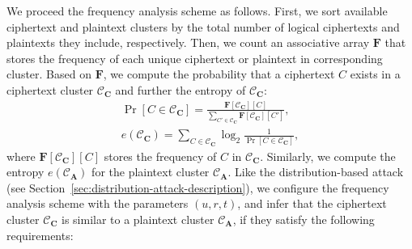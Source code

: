 We proceed the frequency analysis scheme as follows. First, we  sort available ciphertext and plaintext clusters by the total number of logical  ciphertexts and plaintexts they include, respectively. Then, we count an associative array $\mathbf{F}$ that stores the frequency of each unique ciphertext or plaintext in  corresponding cluster. Based on $\mathbf{F}$, we compute the probability that a  ciphertext $C$ exists in a ciphertext cluster $\mathcal{C}_\mathbf{C}$ and further the   
entropy of $\mathcal{C}_\mathbf{C}$:      
\begin{eqnarray*}
    \Pr[C \in \mathcal{C}_\mathbf{C}] = \frac{\mathbf{F}[\mathcal{C}_\mathbf{C}][C]}{\sum_{C' \in \mathcal{C}_\mathbf{C}} \mathbf{F}[\mathcal{C}_\mathbf{C}][C']}, \\
    e(\mathcal{C}_\mathbf{C}) = \sum_{C \in \mathcal{C}_\mathbf{C}} \log_2 \frac{1}{\Pr[C \in \mathcal{C}_\mathbf{C}]},  
\end{eqnarray*}
where   
$\mathbf{F}[\mathcal{C}_\mathbf{C}][C]$  stores the frequency of $C$ in $\mathcal{C}_\mathbf{C}$. Similarly, we  compute the entropy $e(\mathcal{C}_\mathbf{A})$ for the plaintext cluster $\mathcal{C}_\mathbf{A}$.   
Like the distribution-based attack (see Section~\ref{sec:distribution-attack-description}), we configure the frequency analysis scheme with the parameters $(u, r, t)$, and infer that the ciphertext cluster $\mathcal{C}_\mathbf{C}$ is similar to a plaintext cluster $\mathcal{C}_\mathbf{A}$, if they satisfy the following requirements:
